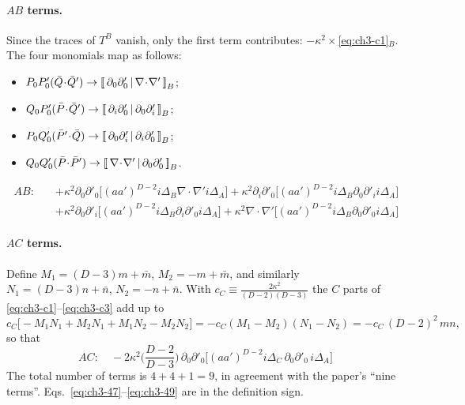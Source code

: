 \paragraph{$AB$ terms.}
Since the traces of $T^B$ vanish, only the first term contributes: $-\kappa^2\times$\eqref{eq:ch3-c1}$_B$. The four monomials map as follows:
\begin{itemize}[leftmargin=14pt]
\item $P_0P'_0(\bar Q\!\cdot\!\bar Q')\to\left[\!\left[\,\partial_0\partial'_0\,\middle|\,\nabla\!\cdot\!\nabla'\,\right]\!\right]_{B}$;
\item $Q_0P'_0(\bar P\!\cdot\!\bar Q')\to\left[\!\left[\,\partial_i\partial'_0\,\middle|\,\partial_0\partial'_i\,\right]\!\right]_{B}$;
\item $P_0Q'_0(\bar P'\!\cdot\!\bar Q)\to\left[\!\left[\,\partial_0\partial'_i\,\middle|\,\partial_i\partial'_0\,\right]\!\right]_{B}$;
\item $Q_0Q'_0(\bar P\!\cdot\!\bar P')\to\left[\!\left[\,\nabla\!\cdot\!\nabla'\,\middle|\,\partial_0\partial'_0\,\right]\!\right]_{B}$.
\end{itemize}
{%
\begin{equation}
\boxed{\;
\begin{aligned}
AB:\quad&+\kappa^2\partial_0\partial'_0\big[(aa')^{D-2}i\Delta_B\nabla\!\cdot\!\nabla'i\Delta_A\big]+\kappa^2\partial_i\partial'_0\big[(aa')^{D-2}i\Delta_B\partial_0\partial'_ii\Delta_A\big]\\
&+\kappa^2\partial_0\partial'_i\big[(aa')^{D-2}i\Delta_B\partial_i\partial'_0i\Delta_A\big]+\kappa^2\nabla\!\cdot\!\nabla'\big[(aa')^{D-2}i\Delta_B\partial_0\partial'_0i\Delta_A\big]
\end{aligned}\;}
\tag{I.48$'$}\label{eq:ch3-48}
\end{equation}
}

\paragraph{$AC$ terms.}
Define $M_1=(D-3)m+\bar m$, $M_2=-m+\bar m$, and similarly $N_1=(D-3)n+\bar n$, $N_2=-n+\bar n$. With $c_C\equiv\tfrac{2\kappa^2}{(D-2)(D-3)}$
the $C$ parts of \eqref{eq:ch3-c1}--\eqref{eq:ch3-c3} add up to
\begin{equation}
c_C\big[-M_1N_1+M_2N_1+M_1N_2-M_2N_2\big]=-c_C(M_1-M_2)(N_1-N_2)=-c_C\,(D-2)^2\,mn ,
\label{eq:ch3-ACfac}
\end{equation}
so that
{%
\begin{equation}
\boxed{\;AC:\quad-2\kappa^2\Big(\frac{D-2}{D-3}\Big)\,\partial_0\partial'_0\big[(aa')^{D-2}i\Delta_C\,\partial_0\partial'_0\,i\Delta_A\big]\;}
\tag{I.49$'$}\label{eq:ch3-49}
\end{equation}
}
The total number of terms is $4+4+1=9$, in agreement with the paper's ``nine terms''. Eqs.~\eqref{eq:ch3-47}--\eqref{eq:ch3-49} are in the definition sign.

